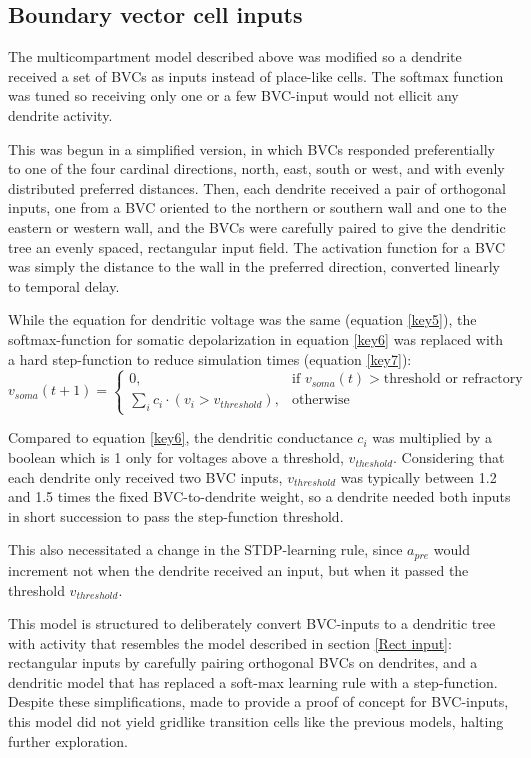 \documentclass{article}
\begin{document}
    \subsection{Boundary vector cell inputs} \label{BVC Model}
    The multicompartment model described above was modified so a dendrite received a set of BVCs as inputs instead of place-like cells. The softmax function was tuned so receiving only one or a few BVC-input would not ellicit any dendrite activity.

    This was begun in a simplified version, in which BVCs responded preferentially to one of the four cardinal directions, north, east, south or west, and with evenly distributed preferred distances. Then, each dendrite received a pair of orthogonal inputs, one from a BVC oriented to the northern or southern wall and one to the eastern or western wall, and the BVCs were carefully paired to give the dendritic tree an evenly spaced, rectangular input field. The activation function for a BVC was simply the distance to the wall in the preferred direction, converted linearly to temporal delay.
        
    While the equation for dendritic voltage was the same (equation \ref{key5}), the softmax-function for somatic depolarization in equation \ref{key6} was replaced with a hard step-function to reduce simulation times (equation \ref{key7}):
    \begin{equation}\label{key7} v_{soma}(t + 1) = \begin{cases} 0, & \text{if } v_{soma}(t) > \text{threshold or refractory}\\
        \sum_{i}^{} c_i \cdot (v_i > v_{threshold}), & \text{otherwise} \end{cases}\end{equation} 
    
    Compared to equation \ref{key6}, the dendritic conductance \(c_i\) was multiplied by a boolean which is 1 only for voltages above a threshold, \(v_{theshold}\). Considering that each dendrite only received two BVC inputs, \(v_{threshold}\) was typically between 1.2 and 1.5 times the fixed BVC-to-dendrite weight, so a dendrite needed both inputs in short succession to pass the step-function threshold.

    This also necessitated a change in the STDP-learning rule, since \(a_{pre}\) would increment not when the dendrite received an input, but when it passed the threshold \(v_{threshold}\).

    This model is structured to deliberately convert BVC-inputs to a dendritic tree with activity that resembles the model described in section \ref{Rect input}: rectangular inputs by carefully pairing orthogonal BVCs on dendrites, and a dendritic model that has replaced a soft-max learning rule with a step-function. Despite these simplifications, made to provide a proof of concept for BVC-inputs, this model did not yield gridlike transition cells like the previous models, halting further exploration.
\end{document}
